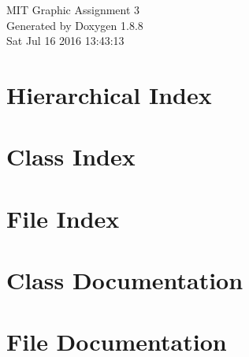 \documentclass[twoside]{book}
\newcommand{\+}{\discretionary{\mbox{\scriptsize$\hookleftarrow$}}{}{}}
\newcommand{\clearemptydoublepage}{%
  \newpage{\pagestyle{empty}\cleardoublepage}%
}
\begin{document}
\hypersetup{pageanchor=false,
             bookmarks=true,
             bookmarksnumbered=true,
             pdfencoding=unicode
            }
\begin{titlepage}
\vspace*{7cm}
\begin{center}%
{\Large M\+I\+T Graphic Assignment 3 }\\
\vspace*{1cm}
{\large Generated by Doxygen 1.8.8}\\
\vspace*{0.5cm}
{\small Sat Jul 16 2016 13:43:13}\\
\end{center}
\end{titlepage}
\clearemptydoublepage
\tableofcontents
\clearemptydoublepage
{}
\hypersetup{pageanchor=true}

\chapter{Hierarchical Index}

\chapter{Class Index}

\chapter{File Index}

\chapter{Class Documentation}






















\chapter{File Documentation}


































\newpage
{}
{}
\printindex
\end{document}
